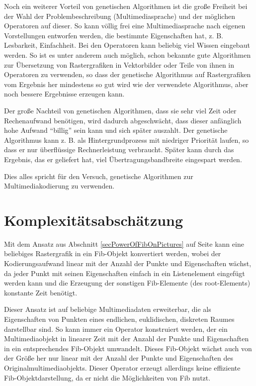 Noch ein weiterer Vorteil von genetischen Algorithmen ist die große Freiheit bei der Wahl der Problembeschreibung (Multimediasprache) und der möglichen Operatoren auf dieser. So kann völlig frei eine Multimediasprache nach eigenen Vorstellungen entworfen werden, die bestimmte Eigenschaften hat, z. B. Lesbarkeit, Einfachheit. Bei den Operatoren kann beliebig viel Wissen eingebaut werden. So ist es unter anderem auch möglich, schon bekannte gute Algorithmen zur Übersetzung von Rastergrafiken in Vektorbilder oder Teile von ihnen in Operatoren zu verwenden, so dass der genetische Algorithmus auf Rastergrafiken vom Ergebnis her mindestens so gut wird wie der verwendete Algorithmus, aber noch bessere Ergebnisse erzeugen kann.

Der große Nachteil von genetischen Algorithmen, dass sie sehr viel Zeit oder Rechenaufwand benötigen, wird dadurch abgeschwächt, dass dieser anfänglich hohe Aufwand ``billig'' sein kann und sich später auszahlt. Der genetische Algorithmus kann z. B. als Hintergrundprozess mit niedriger Priorität laufen, so dass er nur überflüssige Rechnerleistung verbraucht. Später kann durch das Ergebnis, das er geliefert hat, viel Übertragungsbandbreite eingespart werden.

Dies alles spricht für den Versuch, genetische Algorithmen zur Multimediakodierung zu verwenden.


\section{Komplexitätsabschätzung}
\label{abschaet}

Mit dem Ansatz aus Abschnitt \ref{secPowerOfFibOnPictures} auf Seite \pageref{secPowerOfFibOnPictures} kann eine beliebiges Rastergrafik in ein Fib-Objekt konvertiert werden, wobei der Kodierungsaufwand linear mit der Anzahl der Punkte und Eigenschaften wächst, da jeder Punkt mit seinen Eigenschaften einfach in ein Listenelement eingefügt werden kann und die Erzeugung der sonstigen Fib-Elemente (des root-Elements) konstante Zeit benötigt.

Dieser Ansatz ist auf beliebige Multimediadaten erweiterbar, die als Eigenschaften von Punkten eines endlichen, euklidischen, diskreten Raumes darstellbar sind. So kann immer ein Operator konstruiert werden, der ein Multimediaobjekt in linearer Zeit mit der Anzahl der Punkte und Eigenschaften in ein entsprechendes Fib-Objekt umwandelt. Dieses Fib-Objekt wächst auch von der Größe her nur linear mit der Anzahl der Punkte und Eigenschaften des Originalmultimediaobjekts.
Dieser Operator erzeugt allerdings keine effiziente Fib-Objektdarstellung, da er nicht die Möglichkeiten von Fib nutzt.

